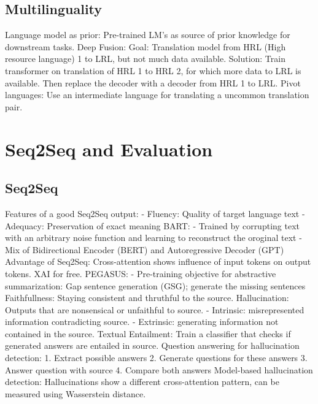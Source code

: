 \documentclass{scrartcl}
\begin{document}
\subsection*{Multilinguality}
Language model as prior: Pre-trained LM's as source of prior knowledge for downstream tasks.
Deep Fusion: Goal: Translation model from HRL (High resource language) 1 to LRL, but not much data available. Solution: Train transformer on translation of HRL 1 to HRL 2, for which more data to LRL is available. Then replace the decoder with a decoder from HRL 1 to LRL.
Pivot languages: Use an intermediate language for translating a uncommon translation pair.


\section*{Seq2Seq and Evaluation}
\subsection*{Seq2Seq}
Features of a good Seq2Seq output:
- Fluency: Quality of target language text
- Adequacy: Preservation of exact meaning
BART:
- Trained by corrupting text with an arbitrary noise function and learning to reconstruct the oroginal text
- Mix of Bidirectional Encoder (BERT) and Autoregressive Decoder (GPT)
Advantage of Seq2Seq: Cross-attention shows influence of input tokens on output tokens. XAI for free.
PEGASUS:
- Pre-training objective for abstractive summarization: Gap sentence generation (GSG); generate the missing sentences
Faithfullness: Staying consistent and thruthful to the source.
Hallucination: Outputs that are nonsensical or unfaithful to source.
- Intrinsic: misrepresented information contradicting source.
- Extrinsic: generating information not contained in the source.
Textual Entailment: Train a classifier that checks if generated answers are entailed in source.
Question answering for hallucination detection:
1. Extract possible answers
2. Generate questions for these answers
3. Answer question with source
4. Compare both answers
Model-based hallucination detection: Hallucinations show a different cross-attention pattern, can be measured using Wasserstein distance.
\end{document}
